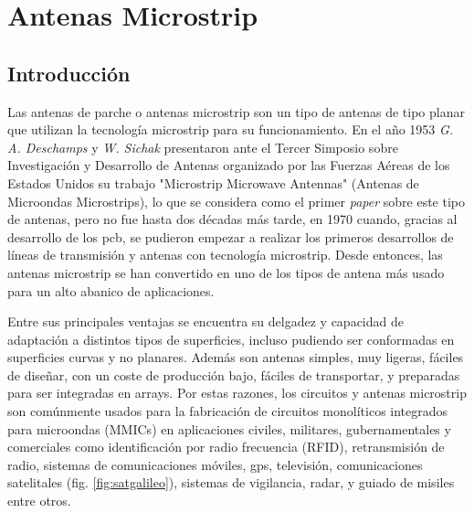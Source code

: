 
\chapter{Antenas Microstrip}
\label{antenasmicrostrip}

\section{Introducción}
\par Las antenas de parche o antenas microstrip son un tipo de antenas de tipo planar que utilizan la tecnología microstrip para su funcionamiento. En el año 1953 \textit{G. A. Deschamps} y \textit{W. Sichak} presentaron ante el Tercer Simposio sobre Investigación y Desarrollo de Antenas organizado por las Fuerzas Aéreas de los Estados Unidos su trabajo "Microstrip Microwave Antennas" (Antenas de Microondas Microstrips), lo que se considera como el primer \textit{paper} sobre este tipo de antenas, pero no fue hasta dos décadas más tarde, en 1970 cuando, gracias al desarrollo de los \gls{pcb}, se pudieron empezar a realizar los primeros desarrollos de líneas de transmisión y antenas con tecnología microstrip. Desde entonces, las antenas microstrip se han convertido en uno de los tipos de antena más usado para un alto abanico de aplicaciones. 
\\
\par Entre sus principales ventajas se encuentra su delgadez y capacidad de adaptación a distintos tipos de superficies, incluso pudiendo ser conformadas en superficies curvas y no planares. Además son antenas simples, muy ligeras, fáciles de diseñar, con un coste de producción bajo, fáciles de transportar, y preparadas para ser integradas en arrays. Por estas razones, los circuitos y antenas microstrip son comúnmente usados para la fabricación de circuitos monolíticos integrados para microondas (MMICs) en aplicaciones civiles, militares, gubernamentales y comerciales como identificación por radio frecuencia (RFID), retransmisión de radio, sistemas de comunicaciones móviles, \gls{gps}, televisión, comunicaciones satelitales (fig. \ref{fig:satgalileo}), sistemas de vigilancia, radar, y guiado de misiles entre otros. 

